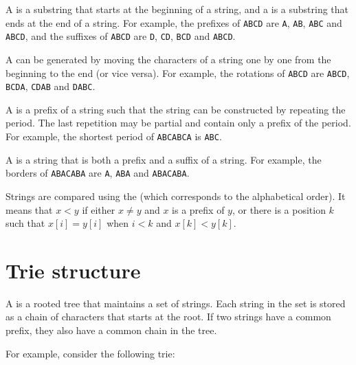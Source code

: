 
A  is a substring that starts at the beginning
of a string,
and a  is a substring that ends at the end
of a string.
For example,
the prefixes of \texttt{ABCD} are
\texttt{A}, \texttt{AB}, \texttt{ABC} and \texttt{ABCD},
and the suffixes of \texttt{ABCD} are
\texttt{D}, \texttt{CD}, \texttt{BCD} and \texttt{ABCD}.


A  can be generated by moving
the characters of a string one by one from the beginning
to the end (or vice versa).
For example, the rotations of \texttt{ABCD} are
\texttt{ABCD}, \texttt{BCDA}, \texttt{CDAB} and \texttt{DABC}.


A  is a prefix of a string such that
the string can be constructed by repeating the period.
The last repetition may be partial and contain
only a prefix of the period.
For example, the shortest period of
\texttt{ABCABCA} is \texttt{ABC}.


A  is a string that is both
a prefix and a suffix of a string.
For example, the borders of \texttt{ABACABA}
are \texttt{A}, \texttt{ABA} and \texttt{ABACABA}.


Strings are compared using the 
(which corresponds to the alphabetical order).
It means that $x<y$ if either $x \neq y$ and $x$ is a prefix of $y$,
or there is a position $k$ such that
$x[i]=y[i]$ when $i<k$ and $x[k]<y[k]$.

\section{Trie structure}


A  is a rooted tree that
maintains a set of strings.
Each string in the set is stored as
a chain of characters that starts at the root.
If two strings have a common prefix,
they also have a common chain in the tree.

For example, consider the following trie:

